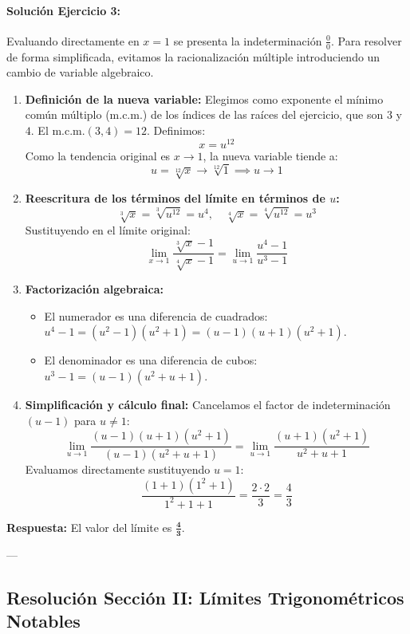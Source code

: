 \documentclass[11pt,letterpaper]{article}
\begin{document}
\paragraph{Solución Ejercicio 3:}
Evaluando directamente en $x=1$ se presenta la indeterminación $\frac{0}{0}$. Para resolver de forma simplificada, evitamos la racionalización múltiple introduciendo un cambio de variable algebraico.
\begin{enumerate}
    \item \textbf{Definición de la nueva variable:} Elegimos como exponente el mínimo común múltiplo (m.c.m.) de los índices de las raíces del ejercicio, que son $3$ y $4$. El $\text{m.c.m.}(3, 4) = 12$. Definimos:
    $$x = u^{12}$$
    Como la tendencia original es $x \to 1$, la nueva variable tiende a:
    $$u = \sqrt[12]{x} \to \sqrt[12]{1} \implies u \to 1$$
    \item \textbf{Reescritura de los términos del límite en términos de $u$:}
    $$\sqrt[3]{x} = \sqrt[3]{u^{12}} = u^4, \quad \sqrt[4]{x} = \sqrt[4]{u^{12}} = u^3$$
    Sustituyendo en el límite original:
    $$\lim_{x\to 1} \frac{\sqrt[3]{x} - 1}{\sqrt[4]{x} - 1} = \lim_{u\to 1} \frac{u^4 - 1}{u^3 - 1}$$
    \item \textbf{Factorización algebraica:}
    \begin{itemize}
        \item El numerador es una diferencia de cuadrados: $u^4 - 1 = (u^2 - 1)(u^2 + 1) = (u - 1)(u + 1)(u^2 + 1)$.
        \item El denominador es una diferencia de cubos: $u^3 - 1 = (u - 1)(u^2 + u + 1)$.
    \end{itemize}
    \item \textbf{Simplificación y cálculo final:} Cancelamos el factor de indeterminación $(u - 1)$ para $u \neq 1$:
    $$\lim_{u\to 1} \frac{(u - 1)(u + 1)(u^2 + 1)}{(u - 1)(u^2 + u + 1)} = \lim_{u\to 1} \frac{(u + 1)(u^2 + 1)}{u^2 + u + 1}$$
    Evaluamos directamente sustituyendo $u = 1$:
    $$\frac{(1 + 1)(1^2 + 1)}{1^2 + 1 + 1} = \frac{2 \cdot 2}{3} = \frac{4}{3}$$
\end{enumerate}
\textbf{Respuesta:} El valor del límite es $\mathbf{\frac{4}{3}}$.

---

\subsection{Resolución Sección II: Límites Trigonométricos Notables}
\end{document}
